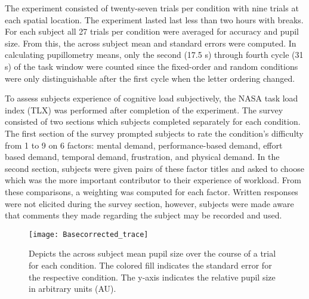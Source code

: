 \documentclass[10pt]{article}
\begin{document}
The experiment consisted of twenty-seven trials per condition
with nine trials at each spatial location.  The experiment
lasted last less than two hours with breaks.   For each
subject all 27 trials per condition were averaged for accuracy
and pupil size.  From this, the across subject mean and
standard errors were computed.  In calculating pupillometry
means, only the second (17.5 s) through fourth cycle (31 s) of
the task window were counted since the fixed-order and random
conditions were only distinguishable after the first cycle
when the letter ordering changed.

To assess subjects experience of cognitive load subjectively,
the NASA task load index (TLX) was performed after completion
of the experiment\cite{kubler}.  The survey consisted of two
sections which subjects completed separately for each
condition.  The first section of the survey prompted subjects
to rate the condition's difficulty from 1 to 9 on 6 factors:
mental demand, performance-based demand, effort based demand,
temporal demand, frustration, and physical demand. In the
second section, subjects were given pairs of these factor
titles and asked to choose which was the more important
contributor to their experience of workload.  From these
comparisons, a weighting was computed for each factor.
Written responses were not elicited during the survey section,
however, subjects were made aware that comments they made
regarding the subject may be recorded and used.




\begin{figure}[ht]
  \centering
  \texttt{[image: Basecorrected\_trace]}
  \caption{Depicts the across subject mean pupil size over the course of a trial
  for each condition.  The colored fill indicates the standard error
  for the respective condition.  The y-axis indicates the
  relative pupil size in arbitrary units (AU).}
  \label{trialtrace}
\end{figure}
\end{document}
